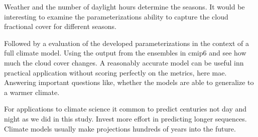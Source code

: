 Weather and the number of daylight hours determine the seasons. 
It would be interesting to examine the parameterizations ability to capture the cloud fractional cover for different seasons. 

Followed by a evaluation of the developed parameterizations in the context of a full climate model. Using the output from the ensembles in \acrshort{cmip6} and see how much the cloud cover changes. A reasonably accurate model can be useful inn practical application without scoring perfectly on the metrics, here \acrshort{mae}. Answering important questions like, whether the models are able to generalize to a warmer climate.

For applications to climate science it common to predict centuries not day and night as we did in this study. Invest more effort in predicting longer sequences. Climate models usually make projections hundreds of years into the future.









